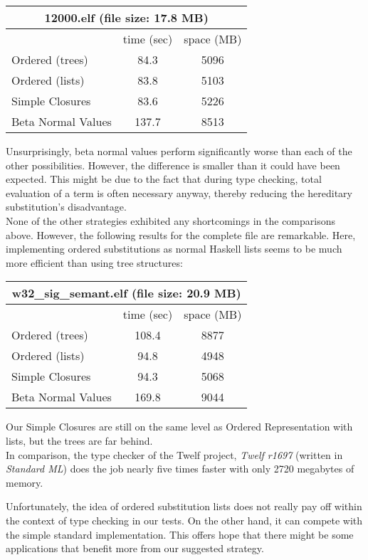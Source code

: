 \documentclass[submission,copyright,creativecommons]{eptcs}
\begin{document}
{\begin{center}
\begin{tabular}{| l || c | c |}
\multicolumn{3}{c}{\textsf{12000.elf} (file size: 17.8 MB)}\\
\hline
& time (sec) & space (MB) \\
\hline
\hline
Ordered (trees) & 84.3 & 5096 \\
\hline
Ordered (lists) & 83.8 & 5103 \\
\hline
Simple Closures & 83.6 & 5226 \\
\hline
Beta Normal Values & 137.7 & 8513 \\
\hline
\end{tabular}
\end{center}
Unsurprisingly, beta normal values perform significantly worse than each of the other possibilities. However, the difference is smaller than it could have been expected. This might be due to the fact that during type checking, total evaluation of a term is often necessary anyway, thereby reducing the hereditary substitution's disadvantage. \\
None of the other strategies exhibited any shortcomings in the comparisons above. However, the following results for the complete file are remarkable. Here, implementing ordered substitutions as normal Haskell lists seems to be much more efficient than using tree structures: 
\begin{center}
 \begin{tabular}{| l || c | c |}
\multicolumn{3}{c}{\textsf{w32\_sig\_semant.elf} (file size: 20.9 MB)}\\
\hline
& time (sec) & space (MB) \\
\hline
\hline
Ordered (trees) & 108.4 & 8877\\
\hline
Ordered (lists) & 94.8 & 4948\\ %
\hline
Simple Closures & 94.3 & 5068 \\ %
\hline
Beta Normal Values & 169.8 & 9044  \\
\hline
\end{tabular}
\end{center}
Our Simple Closures are still on the same level as Ordered Representation with lists, but the trees are far behind. 
\\
In comparison, the type checker of the Twelf project, \emph{Twelf r1697} (written in \emph{Standard ML}) does the job nearly five times faster with only 2720 megabytes of memory.

Unfortunately, the idea of ordered substitution lists does not really pay off within the context of type checking in our tests. 
On the other hand, it can compete with the simple standard implementation. This offers hope that there might be some applications that benefit more from our suggested strategy. 
}
\end{document}
